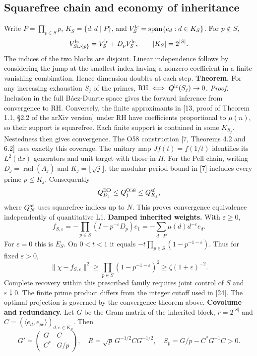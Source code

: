 \documentclass[11pt,a4paper]{article}
\newcommand{\RH}{\mathrm{RH}}
\begin{document}
\subsection{Squarefree chain and economy of inheritance}
Write $P=\prod_{p\in S}p$, $K_S=\{d:d\mid P\}$, and $V_S^{\rm lc}=\operatorname{span}\{e_d:d\in K_S\}$. For $p\notin S$,
\[V_{S\cup\{p\}}^{\rm lc}=V_S^{\rm lc}+D_pV_S^{\rm lc},\qquad |K_S|=2^{|S|}.\]
The indices of the two blocks are disjoint. Linear independence follows by considering the jump at the smallest index having a nonzero coefficient in a finite vanishing combination. Hence dimension doubles at each step.
\textbf{Theorem.} For any increasing exhaustion $S_j$ of the primes, $\RH\iff Q^{\rm lc}(S_j)\to0$.
\emph{Proof.} Inclusion in the full Báez-Duarte space gives the forward inference from convergence to RH. Conversely, the finite approximants in [13, proof of Theorem 1.1, §2.2 of the arXiv version] under RH have coefficients proportional to $\mu(n)$, so their support is squarefree. Each finite support is contained in some $K_{S_j}$. Nestedness then gives convergence. The O58 construction [7, Theorems 4.2 and 6.2] uses exactly this coverage. The unitary map $Jf(t)=f(1/t)$ identifies its $L^2(dx)$ generators and unit target with those in $H$. For the Pell chain, writing $D_j=\operatorname{rad}(A_j)$ and $K_j=\lfloor\sqrt j\rfloor$, the modular period bound in [7] includes every prime $p\le K_j$. Consequently
\[Q^{\rm BD}_{D_j}\le Q_j^{\rm O58}\le Q^{\rm sf}_{K_j},\]
where $Q^{\rm sf}_N$ uses squarefree indices up to $N$. This proves convergence equivalence independently of quantitative L1.
\textbf{Damped inherited weights.} With $\varepsilon\ge0$,
\[f_{S,\varepsilon}=-\prod_{p\in S}(I-p^{-\varepsilon}D_p)e_1=-\sum_{d\mid P}\mu(d)d^{-\varepsilon}e_d.\]
For $\varepsilon=0$ this is $E_S$. On $0<t<1$ it equals $-t\prod_{p\in S}(1-p^{-1-\varepsilon})$. Thus for fixed $\varepsilon>0$,
\[\|\chi-f_{S,\varepsilon}\|^2\ge\prod_{p\in S}(1-p^{-1-\varepsilon})^2\ge\zeta(1+\varepsilon)^{-2}.\]
Complete recovery within this prescribed family requires joint control of $S$ and $\varepsilon\downarrow0$. The finite prime product differs from the integer cutoff used in [24]. The optimal projection is governed by the convergence theorem above.
\textbf{Covolume and redundancy.} Let $G$ be the Gram matrix of the inherited block, $r=2^{|S|}$ and $C=(\langle e_d,e_{pe}\rangle)_{d,e\in K_S}$. Then
\[G'=\begin{pmatrix}G&C\\C^*&G/p\end{pmatrix},\quad R=\sqrt p\,G^{-1/2}CG^{-1/2},\quad S_p=G/p-C^*G^{-1}C>0.\]
\end{document}
